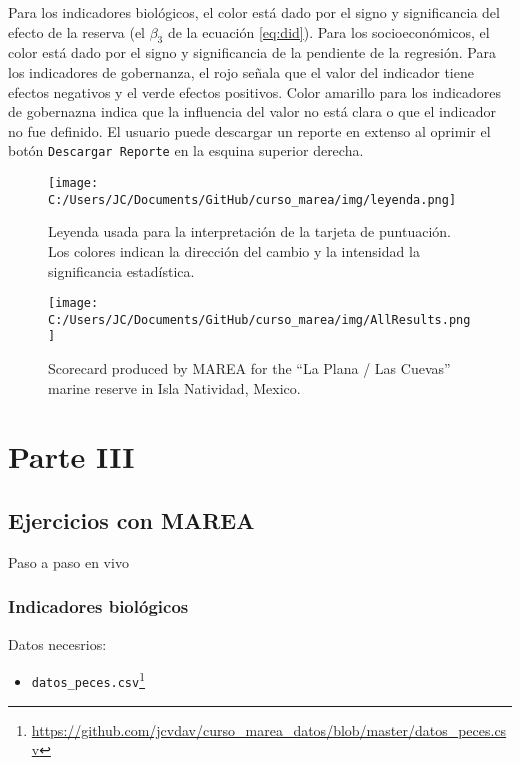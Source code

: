 \documentclass[]{krantz}
\providecommand{\tightlist}{%
  \setlength{\itemsep}{0pt}\setlength{\parskip}{0pt}}
\renewcommand{\href}[2]{#2\footnote{\url{#1}}}
\begin{document}
Para los indicadores biológicos, el color está dado por el signo y significancia del efecto de la reserva (el \(\beta_3\) de la ecuación \eqref{eq:did}). Para los socioeconómicos, el color está dado por el signo y significancia de la pendiente de la regresión. Para los indicadores de gobernanza, el rojo señala que el valor del indicador tiene efectos negativos y el verde efectos positivos. Color amarillo para los indicadores de gobernazna indica que la influencia del valor no está clara o que el indicador no fue definido. El usuario puede descargar un reporte en extenso al oprimir el botón \texttt{Descargar\ Reporte} en la esquina superior derecha.

\begin{figure}
\centering
\texttt{[image: C:/Users/JC/Documents/GitHub/curso\_marea/img/leyenda.png]}
\caption{\label{fig:leyenda}Leyenda usada para la interpretación de la tarjeta de puntuación. Los colores indican la dirección del cambio y la intensidad la significancia estadística.}
\end{figure}

\begin{figure}
\centering
\texttt{[image: C:/Users/JC/Documents/GitHub/curso\_marea/img/AllResults.png]}
\caption{\label{fig:resultados}Scorecard produced by MAREA for the ``La Plana / Las Cuevas'' marine reserve in Isla Natividad, Mexico.}
\end{figure}

\hypertarget{part-parte-iii}{%
\part{Parte III}\label{part-parte-iii}}

\hypertarget{ejercicios-con-marea}{%
\chapter{Ejercicios con MAREA}\label{ejercicios-con-marea}}

Paso a paso en vivo

\hypertarget{indicadores-biologicos}{%
\section{Indicadores biológicos}\label{indicadores-biologicos}}

Datos necesrios:

\begin{itemize}
\tightlist
\item
  \href{https://github.com/jcvdav/curso_marea_datos/blob/master/datos_peces.csv}{\texttt{datos\_peces.csv}}
\end{itemize}
\end{document}
